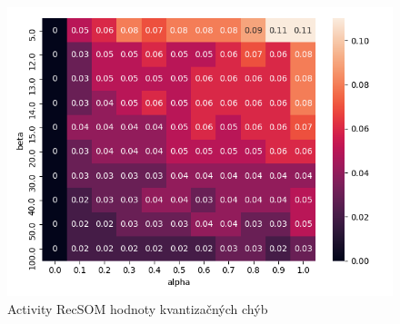     \begin{figure}[H]
        \centering
        \includegraphics[width=\textwidth]{assets/ar_errors}
        \caption{Activity RecSOM hodnoty kvantizačných chýb}
        \label{errors_activity_recsom}
    \end{figure}

    
